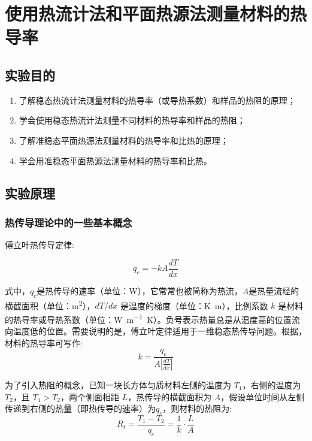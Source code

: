 \chapter{使用热流计法和平面热源法测量材料的热导率}
\section{实验目的}
    \begin{enumerate}
        \item 了解稳态热流计法测量材料的热导率（或导热系数）和样品的热阻的原理；
        \item 学会使用稳态热流计法测量不同材料的热导率和样品的热阻；
        \item 了解准稳态平面热源法测量材料的热导率和比热的原理；
        \item 学会用准稳态平面热源法测量材料的热导率和比热。
    \end{enumerate}
\section{实验原理}%
    \subsection{热传导理论中的一些基本概念}
        傅立叶热传导定律:\par
        \begin{equation}
            q_c=-kA\frac{dT}{dx} \label{equ:A10.1}
        \end{equation} \par
        式中，$q_c$是热传导的速率（单位：\unit{\watt}），它常常也被简称为热流，$A$是热量流经的横截面积（单位：\unit{\meter\squared}），$dT/dx$ 是温度的梯度（单位：\unit{\kelvin\metre}），比例系数 $k$ 是材料的热导率或导热系数（单位：\unit{\watt\per\meter\kelvin}）。负号表示热量总是从温度高的位置流向温度低的位置。需要说明的是，傅立叶定律适用于一维稳态热传导问题。根据，材料的热导率可写作:
        \begin{equation}
            k=\frac{q_c}{A \displaystyle \left|\frac{dT}{dx}\right|} \label{equ:A10.2}
        \end{equation} \par
        为了引入热阻的概念，已知一块长方体匀质材料左侧的温度为 $T_1$，右侧的温度为 $T_2$，且 $T_1 > T_2$，两个侧面相距 $L$，热传导的横截面积为 $A$，假设单位时间从左侧传递到右侧的热量（即热传导的速率）为$q_c$，则材料的热阻为:
        \begin{equation}
            R_t=\frac{T_1-T_2}{q_c}=\frac{1}{k}\cdot\frac{L}{A} \label{equ:A10.3}
        \end{equation} \par

